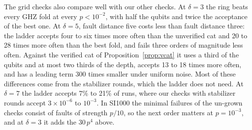\documentclass[aps,prl,reprint,twocolumn,amsmath,amssymb,floatfix,nofootinbib,superscriptaddress]{revtex4-2}
\theoremstyle{definition}
\theoremstyle{remark}
\begin{document}
The grid checks also compare well with our other checks. At $\delta=3$ the ring beats every GHZ fold at every $p<10^{-2}$, with half the qubits and twice the acceptance of the best one. At $\delta=5$, fault distance five costs less than fault distance three: the ladder accepts four to six times more often than the unverified cat and 20 to 28 times more often than the best fold, and fails three orders of magnitude less often. Against the verified cat of Proposition~\ref{prop:vcat} it uses a third of the qubits and at most two thirds of the depth, accepts 13 to 18 times more often, and has a leading term 300 times smaller under uniform noise. Most of these differences come from the stabilizer rounds, which the ladder does not need. At $\delta=7$ the ladder accepts 7\% to 21\% of runs, where our checks with stabilizer rounds accept $3\times10^{-6}$ to $10^{-3}$. In SI1000 the minimal failures of the un-grown checks consist of faults of strength $p/10$, so the next order matters at $p=10^{-3}$, and at $\delta=3$ it adds the $30\,p^4$ above.
\end{document}
